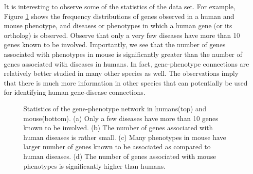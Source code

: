 It is interesting to observe some of the statistics of the data set. For example, Figure \ref{fig:genePhenotypeDist} shows the frequency distributions of genes observed in a human and mouse phenotype, and diseases or phenotypes in which a human gene (or its ortholog) is observed. Observe that only a very few diseases have more than 10 genes known to be involved. Importantly, we see that the number of genes associated with phenotypes in mouse is significantly greater than the number of genes associated with diseases in humans. In fact, gene-phenotype connections are relatively better studied in many other species as well. The observations imply that there is much more information in other species that can potentially be used for identifying human gene-disease connections.

\begin{figure}[ht]
  \begin{center}
  \end{center}
\vspace{-5ex}
\caption{Statistics of the gene-phenotype network in humans(top) and mouse(bottom). (a) Only a few diseases have more than 10 genes known to be involved. (b) The number of genes associated with human diseases is rather small. (c) Many phenotypes in mouse have larger number of genes known to be associated as compared to human diseases. (d) The number of genes associated with mouse phenotypes is significantly higher than humans. }
\label{fig:genePhenotypeDist}
\end{figure}
